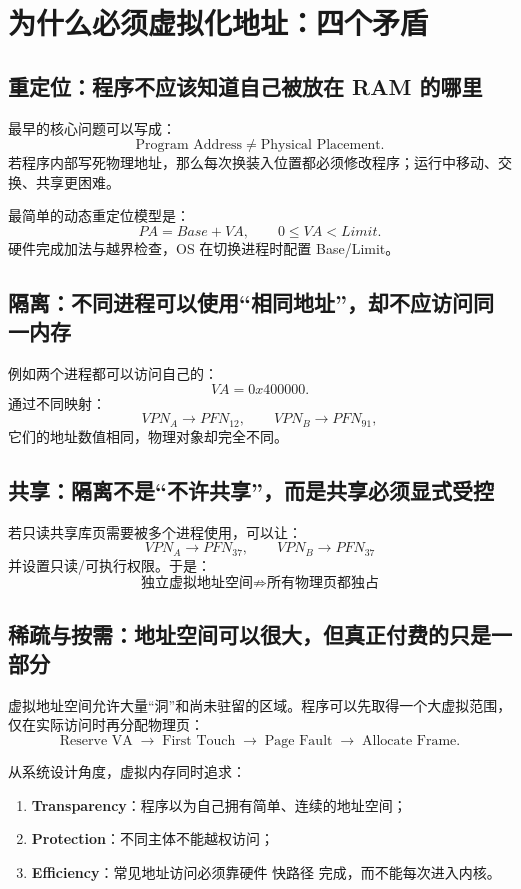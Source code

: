 \documentclass[11pt,a4paper]{ctexart}
\newcommand{\kw}[1]{\textbf{#1}}
\newcommand{\arr}{\;\longrightarrow\;}
\begin{document}
\section{为什么必须虚拟化地址：四个矛盾}

\subsection{重定位：程序不应该知道自己被放在 RAM 的哪里}
最早的核心问题可以写成：
\[
\text{Program Address} \neq \text{Physical Placement}.
\]
若程序内部写死物理地址，那么每次换装入位置都必须修改程序；运行中移动、交换、共享更困难。

最简单的动态重定位模型是：
\[
PA = Base + VA, \qquad 0\le VA<Limit.
\]
硬件完成加法与越界检查，OS 在切换进程时配置 Base/Limit。

\subsection{隔离：不同进程可以使用“相同地址”，却不应访问同一内存}
例如两个进程都可以访问自己的：
\[
VA=0x400000.
\]
通过不同映射：
\[
VPN_A\to PFN_{12},\qquad VPN_B\to PFN_{91},
\]
它们的地址数值相同，物理对象却完全不同。

\subsection{共享：隔离不是“不许共享”，而是共享必须显式受控}
若只读共享库页需要被多个进程使用，可以让：
\[
VPN_A\to PFN_{37},\qquad VPN_B\to PFN_{37}
\]
并设置只读/可执行权限。于是：
\[
\boxed{\text{独立虚拟地址空间} \not\Rightarrow \text{所有物理页都独占}}
\]

\subsection{稀疏与按需：地址空间可以很大，但真正付费的只是一部分}
虚拟地址空间允许大量“洞”和尚未驻留的区域。程序可以先取得一个大虚拟范围，仅在实际访问时再分配物理页：
\[
\text{Reserve VA} \arr \text{First Touch} \arr \text{Page Fault} \arr \text{Allocate Frame}.
\]

\begin{bridge}[虚拟内存的三个最重要目标]
从系统设计角度，虚拟内存同时追求：
\begin{enumerate}
  \item \kw{Transparency}：程序以为自己拥有简单、连续的地址空间；
  \item \kw{Protection}：不同主体不能越权访问；
  \item \kw{Efficiency}：常见地址访问必须靠硬件 快路径 完成，而不能每次进入内核。
\end{enumerate}
\end{bridge}
\end{document}
